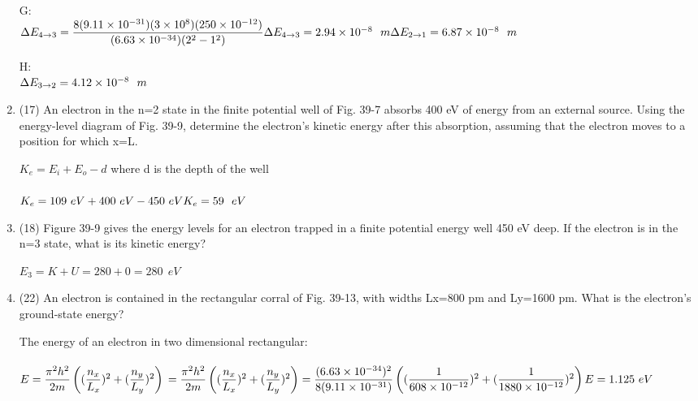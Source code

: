 \documentclass[fleqn]{article}
\begin{document}
\begin{enumerate}
      \textcolor{hwColor}{
        G: \\
        $
          \Delta E_{4 \rightarrow 3}=\dfrac{8(9.11 \times 10^{-31})(3 \times 10^8)(250 \times 10^{-12})}{(6.63 \times 10^{-34})(2^2-1^2)} \\
          \\
          \Delta E_{4 \rightarrow 3}=2.94 \times 10^{-8} ~~ m \\
          \\
          \\
          \Delta E_{2 \rightarrow 1}=6.87 \times 10^{-8} ~~ m \\
        $
      }

      \textcolor{hwColor}{
        H: \\
        $
          \Delta E_{3 \rightarrow 2}=4.12 \times 10^{-8} ~~ m \\
        $
      }


    \item (17) An electron in the n=2 state in the finite potential well of
    Fig. 39-7 absorbs 400 eV of energy from an external source. Using the energy-level diagram of Fig. 39-9, determine the electron’s kinetic energy after this absorption, assuming that the electron
    moves to a position for which x=L.

      \textcolor{hwColor}{
        $
          K_e=E_i+E_o-d
        $ where d is the depth of the well \\
        \\
        $
          K_e=109 ~ eV+400~ eV-450~ eV \\
          \\
          K_e=59 ~~ eV
        $
      }

    \item (18) Figure 39-9 gives the energy levels for an electron trapped in a finite potential energy well 450 eV deep. If the electron is in the
    n=3 state, what is its kinetic energy?
    
      \textcolor{hwColor}{
        $
          E_3=K+U=280+0=280 ~~ eV
        $
      }

    \item (22) An electron is contained in the rectangular corral of Fig. 39-13, with widths Lx=800 pm and Ly=1600 pm. What is the
    electron’s ground-state energy?
    
      \textcolor{hwColor}{
        The energy of an electron in two dimensional rectangular: \\
        \\
        $
          E=\dfrac{\pi^2 h^2}{2m}\left((\dfrac{n_x}{L_x})^2+(\dfrac{n_y}{L_y})^2\right) \\
          \\
          =\dfrac{\pi^2 h^2}{2m}\left((\dfrac{n_x}{L_x})^2+(\dfrac{n_y}{L_y})^2\right)=\dfrac{(6.63 \times 10^{-34})^2}{8(9.11 \times 10^{-31})}\left((\dfrac{1}{608 \times 10^{-12}})^2+(\dfrac{1}{1880 \times 10^{-12}})^2\right) \\
          \\
          E=1.125 ~ eV
        $
      }


\end{enumerate}
\end{document}
